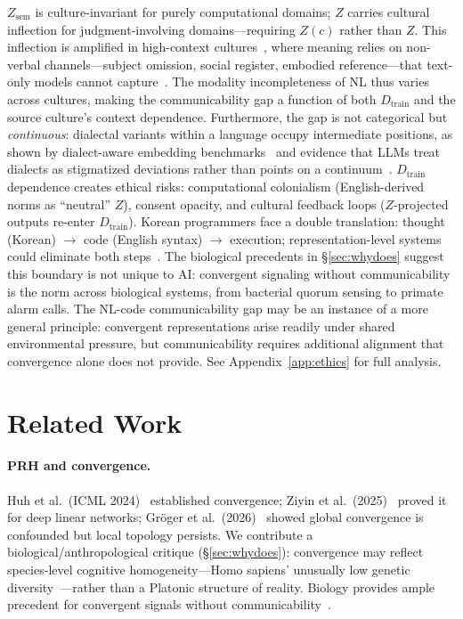 \documentclass[11pt]{article}
\theoremstyle{definition}
\newcommand{\Zsem}{Z_{\text{sem}}}
\newcommand{\Dtrain}{D_{\text{train}}}
\begin{document}
$\Zsem$ is culture-invariant for purely computational domains; $Z$ carries cultural inflection for judgment-involving domains---requiring $Z(c)$ rather than $Z$. This inflection is amplified in high-context cultures~\cite{hall1976beyond}, where meaning relies on non-verbal channels---subject omission, social register, embodied reference---that text-only models cannot capture~\cite{park2024pragmatic}. The modality incompleteness of NL thus varies across cultures, making the communicability gap a function of both $\Dtrain$ and the source culture's context dependence. Furthermore, the gap is not categorical but \emph{continuous}: dialectal variants within a language occupy intermediate positions, as shown by dialect-aware embedding benchmarks~\cite{faisal2025swan} and evidence that LLMs treat dialects as stigmatized deviations rather than points on a continuum~\cite{bui2025dialect}. $\Dtrain$ dependence creates ethical risks: computational colonialism (English-derived norms as ``neutral'' $Z$), consent opacity, and cultural feedback loops ($Z$-projected outputs re-enter $\Dtrain$). Korean programmers face a double translation: thought (Korean) $\to$ code (English syntax) $\to$ execution; representation-level systems could eliminate both steps~\cite{li2026reasoning}. The biological precedents in \S\ref{sec:whydoes} suggest this boundary is not unique to AI: convergent signaling without communicability is the norm across biological systems, from bacterial quorum sensing to primate alarm calls. The NL-code communicability gap may be an instance of a more general principle: convergent representations arise readily under shared environmental pressure, but communicability requires additional alignment that convergence alone does not provide. See Appendix~\ref{app:ethics} for full analysis.



\section{Related Work}\label{sec:related}

\paragraph{PRH and convergence.}
Huh et al.\ (ICML 2024)~\cite{huh2024platonic} established convergence; Ziyin et al.\ (2025)~\cite{ziyin2025proof} proved it for deep linear networks; Gr\"{o}ger et al.\ (2026)~\cite{groger2026aristotelian} showed global convergence is confounded but local topology persists. We contribute a biological/anthropological critique (\S\ref{sec:whydoes}): convergence may reflect species-level cognitive homogeneity---Homo sapiens' unusually low genetic diversity~\cite{pradomartinez2013apes,hu2023bottleneck}---rather than a Platonic structure of reality. Biology provides ample precedent for convergent signals without communicability~\cite{waters2005quorum,seyfarth1980vervet,magrath2015eavesdropping}.
\end{document}
